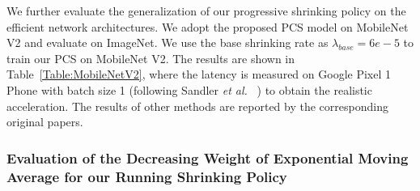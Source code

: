 \documentclass[lettersize,journal]{IEEEtran}
\begin{document}
\begin{table}[t]
\setlength{\tabcolsep}{0.8mm}
  \begin{center}
     \caption{
     Acceleration comparison of the current SOTA models and our PCS on MobileNetV2. \textit{Baseline} is the MobileNetV2. Theoretical Acl. and Realistic Acl. denote the acceleration on MAdds and latency, respectively. 
     $\uparrow$ and $\downarrow$ denote increasing and decreasing, respectively. 
     }
    
     \label{Table:MobileNetV2}
     \scriptsize
  \end{center}
  \vspace{-5mm}
\end{table}

We further evaluate the generalization of our progressive shrinking policy on the efficient network architectures. We adopt the proposed PCS model on MobileNet V2 and evaluate on ImageNet. We use the base shrinking rate as $\lambda_{base}=6e-5$ to train our PCS on MobileNet V2. 
The results are shown in  Table~\ref{Table:MobileNetV2},
 where the latency is measured on Google Pixel 1 Phone with batch size 1 (following Sandler \textit{et al.} ~\cite{sandler2018inverted}) to obtain the realistic acceleration. The results of other methods are reported by the corresponding original papers.

\subsubsection{Evaluation of the Decreasing Weight of Exponential Moving Average for our Running Shrinking Policy}
\end{document}
